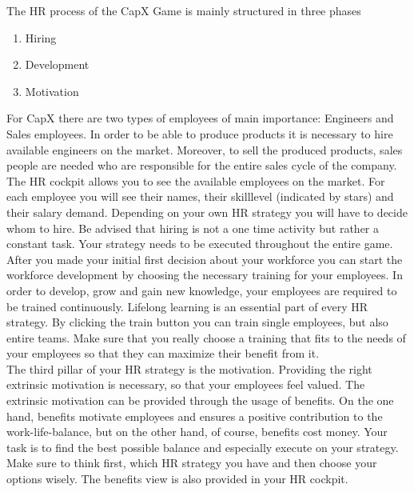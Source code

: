 The HR process of the CapX Game is mainly structured in three phases
\begin{enumerate}
    \item Hiring
    \item Development
    \item Motivation
\end{enumerate}
For CapX there are two types of employees of main importance: Engineers and Sales employees. In order to be able to produce products it is necessary to hire available engineers on the market. Moreover, to sell the produced products, sales people are needed who are responsible for the entire sales cycle of the company. \\ 
The HR cockpit allows you to see the available employees on the market. For each employee you will see their names, their skilllevel (indicated by stars) and their salary demand. Depending on your own HR strategy you will have to decide whom to hire. Be advised that hiring is not a one time activity but rather a constant task. Your strategy needs to be executed throughout the entire game. \\
After you made your initial first decision about your workforce you can start the workforce development by choosing the necessary training for your employees. In order to develop, grow and gain new knowledge, your employees are required to be trained continuously. Lifelong learning is an essential part of every HR strategy. By clicking the train button you can train single employees, but also entire teams. Make sure that you really choose a training that fits to the needs of your employees so that they can maximize their benefit from it. \\
The third pillar of your HR strategy is the motivation. Providing the right extrinsic motivation is necessary, so that your employees feel valued. The extrinsic motivation can be provided through the usage of benefits. On the one hand, benefits motivate employees and ensures a positive contribution to the work-life-balance, but on the other hand, of course, benefits cost money. Your task is to find the best possible balance and especially execute on your strategy. Make sure to think first, which HR strategy you have and then choose your options wisely. The benefits view is also provided in your HR cockpit.